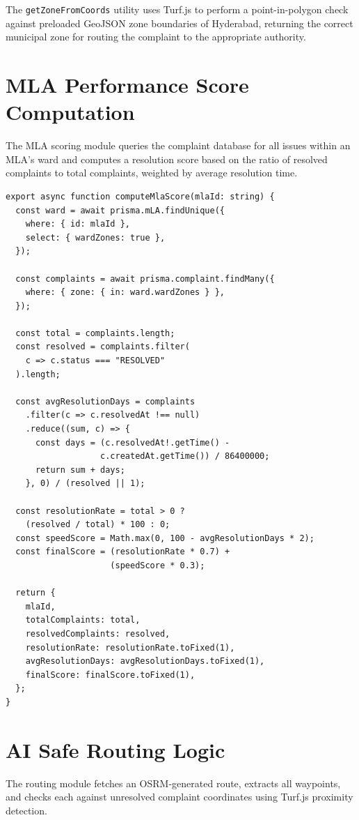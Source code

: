 \documentclass[12pt,a4paper]{report}
\begin{document}
The \texttt{getZoneFromCoords} utility uses Turf.js to perform a
point-in-polygon check against preloaded GeoJSON zone boundaries of
Hyderabad, returning the correct municipal zone for routing the complaint
to the appropriate authority.

\section{MLA Performance Score Computation}
The MLA scoring module queries the complaint database for all issues within
an MLA's ward and computes a resolution score based on the ratio of resolved
complaints to total complaints, weighted by average resolution time.

\begin{lstlisting}[caption={MLA Score Computation ---
lib/scoring/computeMlaScore.ts}]
export async function computeMlaScore(mlaId: string) {
  const ward = await prisma.mLA.findUnique({
    where: { id: mlaId },
    select: { wardZones: true },
  });

  const complaints = await prisma.complaint.findMany({
    where: { zone: { in: ward.wardZones } },
  });

  const total = complaints.length;
  const resolved = complaints.filter(
    c => c.status === "RESOLVED"
  ).length;

  const avgResolutionDays = complaints
    .filter(c => c.resolvedAt !== null)
    .reduce((sum, c) => {
      const days = (c.resolvedAt!.getTime() -
                   c.createdAt.getTime()) / 86400000;
      return sum + days;
    }, 0) / (resolved || 1);

  const resolutionRate = total > 0 ?
    (resolved / total) * 100 : 0;
  const speedScore = Math.max(0, 100 - avgResolutionDays * 2);
  const finalScore = (resolutionRate * 0.7) +
                     (speedScore * 0.3);

  return {
    mlaId,
    totalComplaints: total,
    resolvedComplaints: resolved,
    resolutionRate: resolutionRate.toFixed(1),
    avgResolutionDays: avgResolutionDays.toFixed(1),
    finalScore: finalScore.toFixed(1),
  };
}
\end{lstlisting}

\section{AI Safe Routing Logic}
The routing module fetches an OSRM-generated route, extracts all waypoints,
and checks each against unresolved complaint coordinates using Turf.js
proximity detection.
\end{document}
